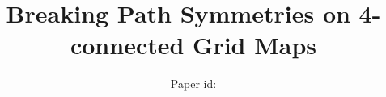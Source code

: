 \documentclass{article}
\begin{document}
\title{Breaking Path Symmetries on 4-connected Grid Maps}
\author{Paper id: }


\maketitle




 





%



\end{document}

